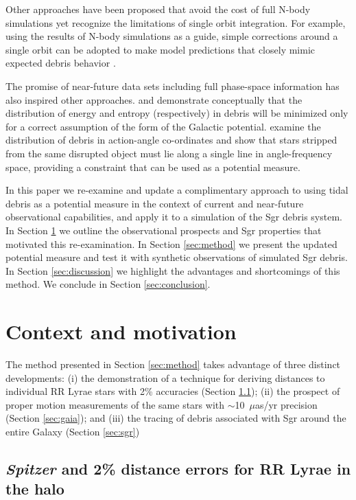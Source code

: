 \documentclass{emulateapj}
\begin{document}
Other approaches have been proposed that avoid the cost of full N-body simulations yet recognize the limitations of single orbit integration.
For example, using the results of N-body simulations as a guide, simple corrections around a single orbit can be adopted to make model predictions that closely
mimic expected debris behavior \citep[e.g.][]{johnston99b,varghese11}.

The promise of near-future data sets including full phase-space information has also inspired other approaches. \citet{binney08} and \citet{penarrubia12} demonstrate conceptually that the distribution of energy and entropy (respectively) in debris will be minimized only for a correct
assumption of the form of the Galactic potential.
\citet{sanders13b} examine the distribution of debris in action-angle co-ordinates and show that stars stripped from the same disrupted object must lie along a single line in angle-frequency space, providing a constraint that can be used as a potential measure.

In this paper we re-examine and update a complimentary approach to using tidal debris as a potential measure \citep[originally proposed by][]{johnston99a}  in the context of current and near-future observational capabilities, and apply it to a simulation of the Sgr debris system.
In Section \ref{sec:context} we outline the observational prospects and Sgr properties that motivated this re-examination.
In Section \ref{sec:method} we present the updated potential measure and test it with synthetic observations of simulated Sgr debris.
In Section \ref{sec:discussion} we highlight the advantages and shortcomings of this method.
We conclude in Section \ref{sec:conclusion}.

\section{Context and motivation} \label{sec:context}
The method presented in Section \ref{sec:method} takes advantage of
three distinct developments: (i)
the demonstration of a technique for deriving distances to individual
RR Lyrae stars with 2\% accuracies (Section \ref{sec:spitzer}); (ii)
the prospect of proper motion measurements of the same stars with
$\sim$10~$\mu$as/yr precision (Section \ref{sec:gaia}); and (iii) the
tracing of debris associated with Sgr around the entire Galaxy
(Section \ref{sec:sgr})

\subsection{{\it Spitzer} and 2\% distance errors for RR Lyrae in the halo}
\label{sec:spitzer}
\end{document}
